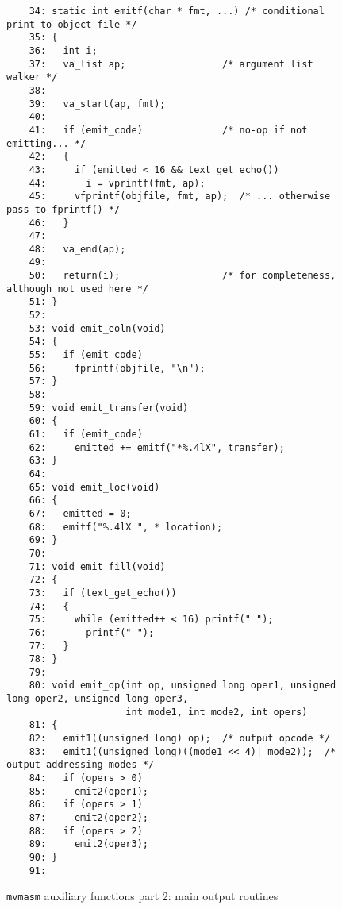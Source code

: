 \begin{figure}
\hspace*{-1cm}
\begin{minipage}{30cm}
\footnotesize
\begin{verbatim}
    34: static int emitf(char * fmt, ...) /* conditional print to object file */
    35: {
    36:   int i; 
    37:   va_list ap;                 /* argument list walker */
    38:   
    39:   va_start(ap, fmt); 
    40:
    41:   if (emit_code)              /* no-op if not emitting... */
    42:   {
    43:     if (emitted < 16 && text_get_echo())
    44:       i = vprintf(fmt, ap); 
    45:     vfprintf(objfile, fmt, ap);  /* ... otherwise pass to fprintf() */
    46:   }
    47:   
    48:   va_end(ap); 
    49:   
    50:   return(i);                  /* for completeness, although not used here */
    51: }
    52: 
    53: void emit_eoln(void)
    54: {
    55:   if (emit_code)
    56:     fprintf(objfile, "\n"); 
    57: }
    58: 
    59: void emit_transfer(void)
    60: {
    61:   if (emit_code)
    62:     emitted += emitf("*%.4lX", transfer); 
    63: }
    64: 
    65: void emit_loc(void)
    66: {
    67:   emitted = 0; 
    68:   emitf("%.4lX ", * location); 
    69: }
    70: 
    71: void emit_fill(void)
    72: {
    73:   if (text_get_echo())
    74:   {
    75:     while (emitted++ < 16) printf(" "); 
    76:       printf(" "); 
    77:   }
    78: }
    79: 
    80: void emit_op(int op, unsigned long oper1, unsigned long oper2, unsigned long oper3, 
                     int mode1, int mode2, int opers)
    81: {
    82:   emit1((unsigned long) op);  /* output opcode */
    83:   emit1((unsigned long)((mode1 << 4)| mode2));  /* output addressing modes */
    84:   if (opers > 0)
    85:     emit2(oper1); 
    86:   if (opers > 1)
    87:     emit2(oper2); 
    88:   if (opers > 2)
    89:     emit2(oper3); 
    90: }
    91: 
\end{verbatim}
\end{minipage}
\caption{{\tt mvmasm} auxiliary functions part 2: main output routines}
\label{mvm_aux.c:2}
\end{figure}
